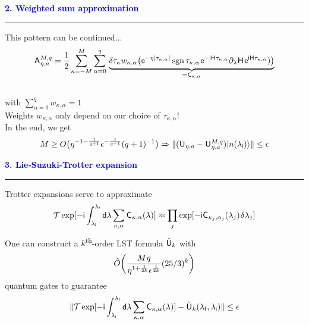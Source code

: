 \documentclass{beamer}
\def\lbt{} %
\DeclareMathOperator{\sgn}{sgn}
\def\mt#1{\kern0.025em\mathsf{#1}\kern0.025em}
\def\d{\mathsf d}
\def\e{\mathsf e}
\def\i{\mathsf i}
\def\lambdai{{\lambda_{\sf i}}}
\def\lambdaf{{\lambda_{\sf f}}}
\def\>{\kern0.08em}
\newenvironment{dia}[2]
{
	\begin{frame}
	\vspace{1mm}
	{\small #1}
	\hfill
    {\small\bf\textcolor{blue}{#2}}
	\vspace{3mm}
	\hrule
	\bigskip
}
{
	\vfill
	\end{frame}
}
\begin{document}
\begin{dia}{\lbt}{2. Weighted sum approximation}
This pattern can be continued... 
\begin{align*}
    \mt A_{\eta, a}^{M, q} = \frac12 \sum_{\kappa = -M}^M \sum_{\alpha = 0}^q \, \underbrace{\delta\tau_\kappa w_{\kappa, \alpha} \big( \e^{-\eta|\tau_{\kappa, \alpha}|} \sgn\tau_{\kappa, \alpha} \> \e^{-\i \mt H \tau_{\kappa, \alpha}} \partial_\lambda \mt H \> \e^{\i \mt H \tau_{\kappa, \alpha}}) \big)}_{{} = \mt C_{\kappa, \alpha}}
\end{align*}
$ $\\[-4mm]
with $\sum_{\alpha = 0}^q w_{\kappa, \alpha} = 1$ \\[6mm]
Weights $w_{\kappa, \alpha}$ only depend on our choice of $\tau_{\kappa, \alpha}$! \\[6mm]
In the end, we get
\begin{align*}
    M \geq O\big( \eta^{-1 - \frac1{q + 1}} \epsilon^{-\frac1{q + 1}} (q + 1)^{-1} \big) \Rightarrow \|(\mt U_{\eta, a} - \mt U_{\eta, a}^{M, q})\ket{n(\lambdai)}\| \leq \epsilon
\end{align*}
\vspace{-0.9cm}
\end{dia}

\begin{dia}{\lbt}{3. Lie-Suzuki-Trotter expansion}
Trotter expansions serve to approximate
\begin{align*}
    \mathcal T \exp[-\i \int_\lambdai^\lambdaf \d\lambda \sum_{\kappa, \alpha} \mt C_{\kappa, \alpha}(\lambda)] 
    \approx \prod_j \exp[-\i \mt C_{\kappa_j, \alpha_j}(\lambda_j) \> \delta\lambda_j]
\end{align*} \pause
One can construct a $k$\textsuperscript{th}-order LST formula $\tilde{\mt U}_k$ with
\begin{align*}
    \tilde O\bigg( \frac{M \> q}{\eta^{1 + \frac1{2k}}\epsilon^{\frac1{2k}}} (25/3)^k \bigg)
\end{align*}
quantum gates to guarantee 
\begin{align*}
    \| \mathcal T \exp[-\i \int_\lambdai^\lambdaf \d\lambda \sum_{\kappa, \alpha} \mt C_{\kappa, \alpha}(\lambda)] - \tilde{\mt U}_k(\lambdaf, \lambdai) \| \leq \epsilon
\end{align*}
\vspace*{-1cm}
\end{dia}
\end{document}
